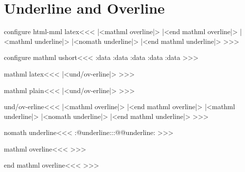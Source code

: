{{{{{{\section{Underline and Overline}


\<configure html-mml latex\><<<
   {\bgroup\ifmathml |<mathml overline|>\else
         \fi}
   {\ifmathml |<end mathml overline|>\else {}\fi\egroup}
   {\bgroup
    \ifmathml |<mathml underline|>%
    \else |<nomath underline|>\fi}
   {\ifmathml |<end mathml underline|>\else {}\fi \egroup}
>>>


\<configure mathml ushort\><<<
   {\bgroup
    \expandafter\ushort:data
   }
   {\egroup}
   {\bgroup
    \expandafter\ushort:data
   }
   {\egroup}
   {\bgroup
    \expandafter\ushortd:data
   }
   {\egroup}
   {\bgroup
    \expandafter\ushortd:data
   }
   {\egroup}
   {\bgroup\expandafter\ushortdline:data }
   {\egroup}
\def\ushort:data#1#2{\underline{\:gobbleIII #2}}
\def\ushortd:data#1#2{\underline{\underline{\:gobbleIII #2}}}
\def\ushortdline:data#1#2{#1{#1{\:gobble #2}}}
>>>


\<mathml latex\><<<
|<und/ov-erline|>
>>>

\<mathml plain\><<<
|<und/ov-erline|>
>>>


\<und/ov-erline\><<<
   {\bgroup |<mathml overline|>}
   {|<end mathml overline|>\egroup}
   {\bgroup \ifmmode |<mathml underline|>\else 
     |<nomath underline|>\fi}
   {|<end mathml underline|>\egroup}
>>>

\<nomath underline\><<<
\expandafter\everymath
\expandafter{\expandafter\everymath
             \expandafter{\the\everymath}}%
\let\o::@underline:\o:@@underline:
\def\o:@@underline:{\let\o:@@underline:\o::@underline:}%
>>>











\<mathml overline\><<<
%
>>>

\<end mathml overline\><<<
%
>>>

}}}}}}
